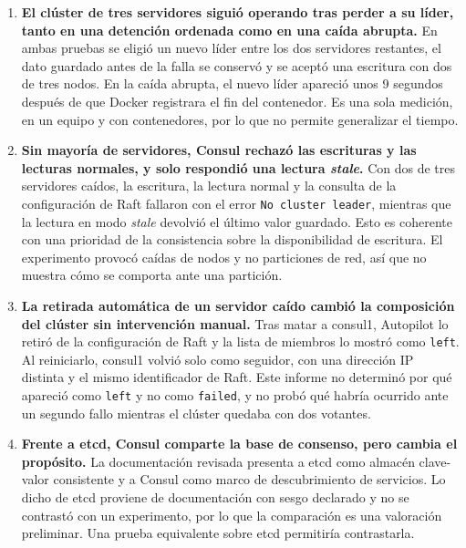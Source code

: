 \documentclass[12pt,a4paper]{article}
\begin{document}
\begin{enumerate}
  \item \textbf{El clúster de tres servidores siguió operando tras perder a su líder, tanto en una detención ordenada como en una caída abrupta.} En ambas pruebas se eligió un nuevo líder entre los dos servidores restantes, el dato guardado antes de la falla se conservó y se aceptó una escritura con dos de tres nodos. En la caída abrupta, el nuevo líder apareció unos 9 segundos después de que Docker registrara el fin del contenedor. Es una sola medición, en un equipo y con contenedores, por lo que no permite generalizar el tiempo.

  \item \textbf{Sin mayoría de servidores, Consul rechazó las escrituras y las lecturas
  normales, y solo respondió una lectura \textit{stale}.} Con dos de tres servidores caídos, la escritura, la lectura normal y la consulta de la configuración de Raft fallaron con el error \texttt{No cluster leader}, mientras que la lectura en modo \textit{stale} devolvió el último valor guardado. Esto es coherente con una prioridad de la consistencia sobre la disponibilidad de escritura. El experimento provocó caídas de nodos y no particiones de red, así que no muestra cómo se comporta ante una partición.

  \item \textbf{La retirada automática de un servidor caído cambió la composición del clúster sin
  intervención manual.} Tras matar a consul1, Autopilot lo retiró de la configuración de Raft y la lista de miembros lo mostró como \texttt{left}. Al reiniciarlo, consul1 volvió solo como seguidor, con una dirección IP distinta y el mismo identificador de Raft. Este informe no determinó por qué apareció como \texttt{left} y no como \texttt{failed}, y no probó qué habría ocurrido ante un segundo fallo mientras el clúster quedaba con dos votantes.

  \item \textbf{Frente a etcd, Consul comparte la base de consenso, pero cambia el propósito.}
  La documentación revisada presenta a etcd como almacén clave-valor consistente y a Consul como marco de descubrimiento de servicios. Lo dicho de etcd proviene de
  documentación con sesgo declarado y no se contrastó con un experimento, por lo que la
  comparación es una valoración preliminar. Una prueba equivalente sobre etcd permitiría
  contrastarla.
\end{enumerate}

\end{document}
